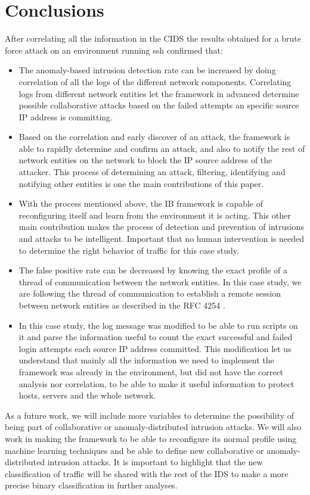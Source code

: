 \documentclass[conference]{IEEEtran}
\begin{document}
\section{Conclusions}
\label{conclusion}
After correlating all the information in the CIDS the results obtained for a brute force attack on an environment running ssh confirmed that:
\begin{itemize}
\item The anomaly-based intrusion detection rate can be increased by doing correlation of all the logs of the different network components. Correlating logs from different network entities let the framework in advanced determine possible collaborative attacks based on the failed attempts an specific source IP address is committing.
\item Based on the correlation and early discover of an attack, the framework is able to rapidly determine and confirm an attack, and also to notify the rest of network entities on the network to block the IP source address of the attacker. This process of determining an attack, filtering, identifying and notifying other entities is one the main contributions of this paper. 
\item With the process mentioned above, the IB framework is capable of reconfiguring itself and learn from the environment it is acting. This other main contribution makes the process of detection and prevention of intrusions and attacks to be intelligent. Important that no human intervention is needed to determine the right behavior of traffic for this case study.
\item The false positive rate can be decreased by knowing the exact profile of a thread of communication between the network entities. In this case study, we are following the thread of communication to establish a remote session between network entities as described in the RFC 4254 \cite{RFC4254}. 
\item In this case study, the log message was modified to be able to run scripts on it and parse the information useful to count the exact successful and failed login attempts each source IP address committed. This modification let us understand that mainly all the information we need to implement the framework was already in the environment, but did not have the correct analysis nor correlation, to be able to make it useful information to protect hosts, servers and the whole network.
\end{itemize}

As a future work, we will include more variables to determine the possibility of being part of collaborative or anomaly-distributed intrusion attacks. We will also work in making the framework to be able to reconfigure its normal profile using machine learning techniques and be able to define new collaborative or anomaly-distributed intrusion attacks. It is important to highlight that the new classification of traffic will be shared with the rest of the IDS to make a more precise binary classification in further analyses.
\end{document}
